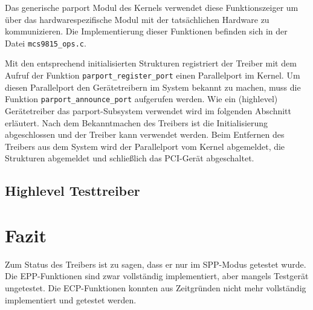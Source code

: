 \documentclass[a4paper,11pt]{article}
\begin{document}
Das generische parport Modul des Kernels verwendet diese Funktionszeiger um über das hardwarespezifische Modul mit 
der tatsächlichen Hardware zu kommunizieren.
Die Implementierung dieser Funktionen befinden sich in der Datei \verb|mcs9815_ops.c|. 

Mit den entsprechend initialisierten Strukturen registriert der Treiber mit dem Aufruf der Funktion \verb|parport_register_port| einen Parallelport im Kernel.
Um diesen Parallelport den Gerätetreibern im System bekannt zu machen, muss die Funktion \verb|parport_announce_port| aufgerufen werden.
Wie ein (highlevel) Gerätetreiber das parport-Subsystem verwendet wird im folgenden Abschnitt erläutert.
Nach dem Bekanntmachen des Treibers ist die Initialisierung abgeschlossen und der Treiber kann verwendet werden.
Beim Entfernen des Treibers aus dem System wird der Parallelport vom Kernel abgemeldet, die Strukturen abgemeldet und schließlich das PCI-Gerät 
abgeschaltet.

\subsection{Highlevel Testtreiber}

\section{Fazit}

Zum Status des Treibers ist zu sagen, dass er
nur im SPP-Modus getestet wurde. Die EPP-Funktionen sind zwar vollständig implementiert, aber mangels Testgerät ungetestet.
Die ECP-Funktionen konnten aus Zeitgründen nicht mehr vollständig implementiert und getestet werden.


\end{document}
